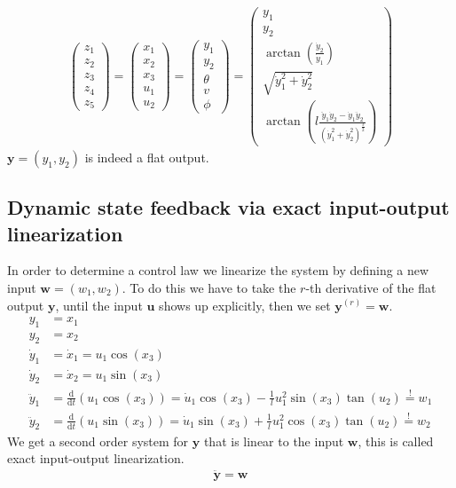 \documentclass[a4paper,11pt,headings=standardclasses]{scrartcl}%
\renewcommand{\d}{\mathrm{d}} %
\newcommand{\uu}{\mathbf{u}}
\newcommand{\y}{\mathbf{y}}
\begin{document}
\begin{align}
\begin{pmatrix} z_1 \\ z_2 \\ z_3 \\ z_4 \\ z_5 \end{pmatrix} = 
\begin{pmatrix} x_1 \\ x_2 \\ x_3 \\ u_1 \\ u_2 \end{pmatrix} = 
\begin{pmatrix} y_1 \\ y_2 \\ \theta \\v \\  \phi \end{pmatrix} =
\begin{pmatrix} y_1 \\ y_2 \\  \arctan\left(\frac{\dot{y}_2}{\dot{y}_1}\right)\\ \sqrt{\dot{y}_1^2+\dot{y}_2^2}\\ \arctan\left(l \frac{\ddot{y}_1 \dot{y}_2 - \dot{y}_1 \ddot{y}_2}{(\dot{y}_1^2+\dot{y}_2^2)^{\frac{3}{2}}} 
\right) \end{pmatrix}
\end{align}
$\y = (y_1, y_2)$ is indeed a flat output.
\subsection{Dynamic state feedback via exact input-output linearization}
In order to determine a control law we linearize the system by defining a new input $\mathbf{w}=(w_1,w_2)$. To do this we have to take the $r$-th derivative of the flat output $\y$, until the input $\uu$ shows up explicitly, then we set $\y^{(r)}=\mathbf{w}$.
\begin{subequations}
\begin{align}
y_1 &= x_1 \\
y_2 &= x_2 \\
\dot{y}_1 &= \dot{x}_1 = u_1 \cos(x_3)\\
\dot{y}_2 &= \dot{x}_2 = u_1 \sin(x_3) \\
\ddot{y}_1 &= \frac{\d}{\d t}(u_1 \cos(x_3)) = \dot{u}_1 \cos(x_3) - \frac{1}{l}u_1^2\sin(x_3)\tan(u_2) \overset{!}{=} w_1 \label{eq:7e} \\
\ddot{y}_2 &= \frac{\d}{\d t}(u_1 \sin(x_3)) = \dot{u}_1 \sin(x_3) + \frac{1}{l}u_1^2\cos(x_3)\tan(u_2) \overset{!}{=} w_2  \label{eq:7f}
\end{align}
\end{subequations}
We get a second order system for $\y$ that is linear to the input $\mathbf{w}$, this is called exact input-output linearization.
\begin{align}
\label{eq:8}
\ddot{\y} = \mathbf{w}
\end{align}
\end{document}
